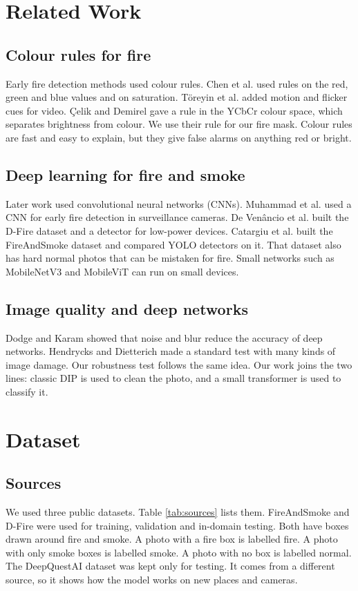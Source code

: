 \documentclass[10pt,twocolumn,letterpaper]{article}
\begin{document}
\section{Related Work}
\subsection{Colour rules for fire}
Early fire detection methods used colour rules. Chen et al. \cite{chen} used rules on the red, green and blue values and on saturation. Töreyin et al. \cite{toreyin} added motion and flicker cues for video. Çelik and Demirel \cite{celik} gave a rule in the YCbCr colour space, which separates brightness from colour. We use their rule for our fire mask. Colour rules are fast and easy to explain, but they give false alarms on anything red or bright.

\subsection{Deep learning for fire and smoke}
Later work used convolutional neural networks (CNNs). Muhammad et al. \cite{muhammad} used a CNN for early fire detection in surveillance cameras. De Venâncio et al. \cite{dfire} built the D-Fire dataset and a detector for low-power devices. Catargiu et al. \cite{catargiu} built the FireAndSmoke dataset and compared YOLO detectors on it. That dataset also has hard normal photos that can be mistaken for fire. Small networks such as MobileNetV3 \cite{mobilenetv3} and MobileViT \cite{mobilevit} can run on small devices.

\subsection{Image quality and deep networks}
Dodge and Karam \cite{dodge} showed that noise and blur reduce the accuracy of deep networks. Hendrycks and Dietterich \cite{hendrycks} made a standard test with many kinds of image damage. Our robustness test follows the same idea. Our work joins the two lines: classic DIP is used to clean the photo, and a small transformer is used to classify it.


\section{Dataset}
\subsection{Sources}
We used three public datasets. Table \ref{tab:sources} lists them. FireAndSmoke \cite{catargiu} and D-Fire \cite{dfire} were used for training, validation and in-domain testing. Both have boxes drawn around fire and smoke. A photo with a fire box is labelled fire. A photo with only smoke boxes is labelled smoke. A photo with no box is labelled normal. The DeepQuestAI dataset \cite{deepquest} was kept only for testing. It comes from a different source, so it shows how the model works on new places and cameras.
\end{document}
